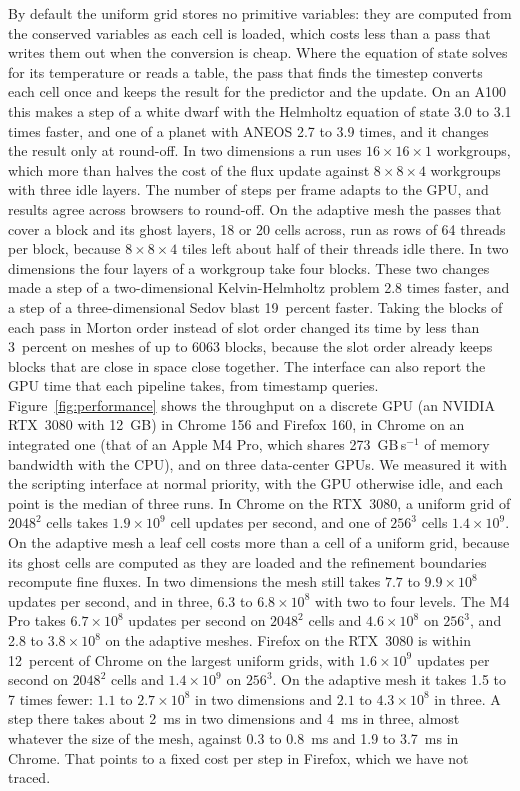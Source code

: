 \documentclass[twocolumn]{aastex701}
\begin{document}
By default the uniform grid stores no primitive variables: they are computed from the conserved variables as each cell is loaded, which costs less than a pass that writes them out when the conversion is cheap. Where the equation of state solves for its temperature or reads a table, the pass that finds the timestep converts each cell once and keeps the result for the predictor and the update. On an A100 this makes a step of a white dwarf with the Helmholtz equation of state 3.0 to 3.1 times faster, and one of a planet with ANEOS 2.7 to 3.9 times, and it changes the result only at round-off. In two dimensions a run uses $16 \times 16 \times 1$ workgroups, which more than halves the cost of the flux update against $8 \times 8 \times 4$ workgroups with three idle layers. The number of steps per frame adapts to the GPU, and results agree across browsers to round-off. On the adaptive mesh the passes that cover a block and its ghost layers, 18 or 20 cells across, run as rows of 64 threads per block, because $8 \times 8 \times 4$ tiles left about half of their threads idle there. In two dimensions the four layers of a workgroup take four blocks. These two changes made a step of a two-dimensional Kelvin-Helmholtz problem 2.8 times faster, and a step of a three-dimensional Sedov blast 19~percent faster. Taking the blocks of each pass in Morton order instead of slot order changed its time by less than 3~percent on meshes of up to 6063 blocks, because the slot order already keeps blocks that are close in space close together. The interface can also report the GPU time that each pipeline takes, from timestamp queries. Figure~\ref{fig:performance} shows the throughput on a discrete GPU (an NVIDIA RTX~3080 with 12~GB) in Chrome 156 and Firefox 160, in Chrome on an integrated one (that of an Apple M4 Pro, which shares 273~GB\,s$^{-1}$ of memory bandwidth with the CPU), and on three data-center GPUs. We measured it with the scripting interface at normal priority, with the GPU otherwise idle, and each point is the median of three runs. In Chrome on the RTX~3080, a uniform grid of $2048^2$ cells takes $1.9 \times 10^9$ cell updates per second, and one of $256^3$ cells $1.4 \times 10^9$. On the adaptive mesh a leaf cell costs more than a cell of a uniform grid, because its ghost cells are computed as they are loaded and the refinement boundaries recompute fine fluxes. In two dimensions the mesh still takes $7.7$ to $9.9 \times 10^8$ updates per second, and in three, $6.3$ to $6.8 \times 10^8$ with two to four levels. The M4 Pro takes $6.7 \times 10^8$ updates per second on $2048^2$ cells and $4.6 \times 10^8$ on $256^3$, and 2.8 to $3.8 \times 10^8$ on the adaptive meshes. Firefox on the RTX~3080 is within 12~percent of Chrome on the largest uniform grids, with $1.6 \times 10^9$ updates per second on $2048^2$ cells and $1.4 \times 10^9$ on $256^3$. On the adaptive mesh it takes 1.5 to 7 times fewer: $1.1$ to $2.7 \times 10^8$ in two dimensions and $2.1$ to $4.3 \times 10^8$ in three. A step there takes about 2~ms in two dimensions and 4~ms in three, almost whatever the size of the mesh, against 0.3 to 0.8~ms and 1.9 to 3.7~ms in Chrome. That points to a fixed cost per step in Firefox, which we have not traced.
\end{document}
